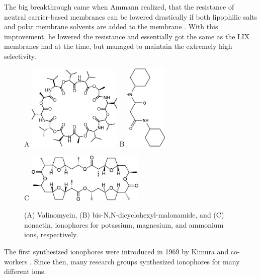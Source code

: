 The big breakthrough came when Ammann realized, that the resistance of neutral carrier-based membranes can be lowered drastically if both lipophilic salts and polar membrane solvents are added to the membrane \cite{ammann1987valinomycin}.
With this improvement, he lowered the resistance and essentially got the same as the LIX membranes had at the time, but managed to maintain the extremely high selectivity.

\begin{figure}[h]
\centering
A \includegraphics[width=0.4\textwidth]{img/theory/Valinomycin.eps}\hspace{1cm} B \includegraphics[width=0.18\textwidth]{img/theory/mg_ionophore.eps}

\vspace{1cm}

C \includegraphics[width=0.5\textwidth]{img/theory/Nonactin.eps}
\caption{(A) Valinomycin, (B) bis-N,N-dicyclohexyl-malonamide, and (C) nonactin, ionophores for potassium, magnesium, and ammonium ions, respectively.}
\label{fig:ionophores}
\end{figure}

The first synthesized ionophores were introduced in 1969 by Kimura and co-workers \cite{kimura1979potassium}.
Since then, many research groups synthesized ionophores for many different ions.


